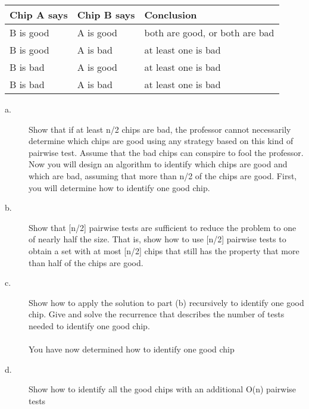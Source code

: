 \documentclass[12pt]{article}
\begin{document}
        \begin{tabular}{l l l}
            
             Chip A says&Chip B says & Conclusion \\
             \hline
             B is good&A is good&both are good, or both are bad\\
             B is good&A is bad&at least one is bad \\
             B is bad&A is good&at least one is bad \\
             B is bad&A is bad&at least one is bad \\

        \end{tabular}
    \begin{description}
   
        \item[a.] Show that if at least n/2 chips are bad, the professor cannot necessarily determine which chips are good using any strategy based on this kind of pairwise test. Assume that the bad chips can conspire to fool the professor. \\
        Now you will design an algorithm to identify which chips are good and which are bad, assuming that more than n/2 of the chips are good. First, you will determine how to identify one good chip.
        \item[b.] Show that [n/2] pairwise tests are sufficient to reduce the problem to one of nearly half the size. That is, show how to use [n/2] pairwise tests to obtain a set with at most [n/2] chips that still has the property that more than half of the chips are good.
        \item[c.]Show how to apply the solution to part (b) recursively to identify one good chip. Give and solve the recurrence that describes the number of tests needed to identify one good chip. \\\\
    You have now determined how to identify one good chip
        \item[d.] Show how to identify all the good chips with an additional O(n) pairwise tests
    \end{description}
\end{document}
